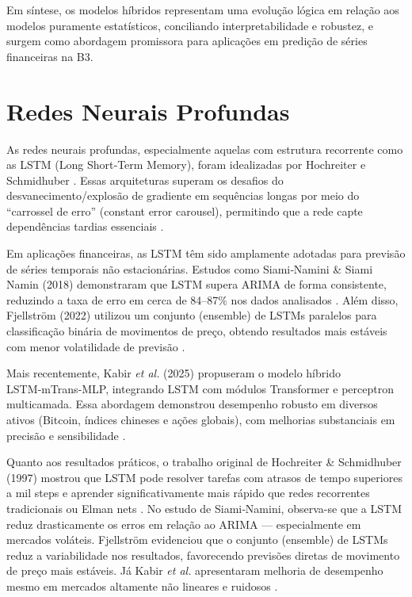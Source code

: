 Em síntese, os modelos híbridos representam uma evolução lógica em relação aos modelos puramente estatísticos, conciliando interpretabilidade e robustez, e surgem como abordagem promissora para aplicações em predição de séries financeiras na B3.

















\section{Redes Neurais Profundas}

As redes neurais profundas, especialmente aquelas com estrutura recorrente como as LSTM (Long Short‑Term Memory), foram idealizadas por Hochreiter e Schmidhuber \cite{hochreiter_1997}. Essas arquiteturas superam os desafios do desvanecimento/explosão de gradiente em sequências longas por meio do “carrossel de erro” (constant error carousel), permitindo que a rede capte dependências tardias essenciais \cite{hochreiter_1997}.

Em aplicações financeiras, as LSTM têm sido amplamente adotadas para previsão de séries temporais não estacionárias. Estudos como Siami‑Namini \& Siami Namin (2018) demonstraram que LSTM supera ARIMA de forma consistente, reduzindo a taxa de erro em cerca de 84–87\% nos dados analisados \cite{siami2018arima_vs_lstm}. Além disso, Fjellström (2022) utilizou um conjunto (ensemble) de LSTMs paralelos para classificação binária de movimentos de preço, obtendo resultados mais estáveis com menor volatilidade de previsão \cite{fjellstrom2022ensemble}. 

Mais recentemente, Kabir \textit{et al.} (2025) propuseram o modelo híbrido LSTM‑mTrans‑MLP, integrando LSTM com módulos Transformer e perceptron multicamada. Essa abordagem demonstrou desempenho robusto em diversos ativos (Bitcoin, índices chineses e ações globais), com melhorias substanciais em precisão e sensibilidade \cite{kabir2025lstm_trans_mlp}.

Quanto aos resultados práticos, o trabalho original de Hochreiter \& Schmidhuber (1997) mostrou que LSTM pode resolver tarefas com atrasos de tempo superiores a mil steps e aprender significativamente mais rápido que redes recorrentes tradicionais ou Elman nets \cite{hochreiter_1997}. No estudo de Siami‑Namini, observa-se que a LSTM reduz drasticamente os erros em relação ao ARIMA — especialmente em mercados voláteis. Fjellström evidenciou que o conjunto (ensemble) de LSTMs reduz a variabilidade nos resultados, favorecendo previsões diretas de movimento de preço mais estáveis. Já Kabir \textit{et al.} apresentaram melhoria de desempenho mesmo em mercados altamente não lineares e ruidosos \cite{kabir2025lstm_trans_mlp}.

